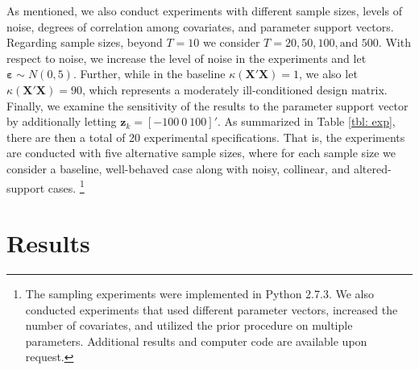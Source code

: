 \documentclass[english]{article}
\begin{document}
As mentioned, we also conduct experiments with different sample sizes, 
levels of noise, degrees of correlation among covariates, and parameter 
support vectors.
Regarding sample sizes, beyond $T=10$ we consider $T=20, 50, 100, 
\text{and } 500$. 
With respect to noise, we increase the level of noise in the experiments and 
let $\mathbf{\varepsilon}\sim N(0,5)$.
Further, while in the baseline $\kappa(\mathbf{X}'\mathbf{X})=1$, we
also let $\kappa(\mathbf{X}'\mathbf{X})=90$, which represents a 
moderately ill-conditioned design matrix.
Finally, we examine the sensitivity of the results to the parameter support
vector by additionally letting $\mathbf{z}_k = [- 100 ~ 0 ~ 100]'$.
As summarized in Table \ref{tbl: exp}, there are then a total of 20 
experimental specifications. 
That is, the experiments are conducted with five alternative sample sizes, 
where for each sample size we consider a baseline, well-behaved case along
with noisy, collinear, and altered-support cases.%
\footnote{The sampling experiments were implemented in Python 
2.7.3. 
We also conducted experiments that used different parameter vectors, 
increased the number of covariates, and utilized the prior procedure on
multiple parameters.
Additional results and computer code are available upon request.}


\section{Results}
\label{sec: results}


%
\end{document}
